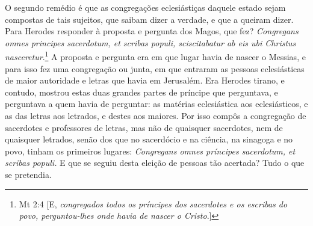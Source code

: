 O segundo remédio é que as congregações eclesiástiças daquele estado
sejam compostas de tais sujeitos, que saibam dizer a verdade, e que a
queiram dizer. Para Herodes responder à proposta e pergunta dos Magos,
que fez? \emph{Congregans omnes principes sacerdotum, et scribas populi,
sciscitabatur ab eis ubi Christus nasceretur}.\footnote{Mt 2:4 [E, \emph{congregados todos os príncipes dos sacerdotes e os escribas do povo, perguntou-lhes
onde havia de nascer o Cristo}.]} A proposta e
pergunta era em que lugar havia de nascer o Messias, e para isso fez uma
congregação ou junta, em que entraram as pessoas eclesiásticas de maior
autoridade e letras que havia em Jerusalém. Era Herodes tirano, e
contudo, mostrou estas duas grandes partes de príncipe que perguntava, e
perguntava a quem havia de perguntar: as matérias eclesiástica aos
eclesiásticos, e as das letras aos letrados, e destes aos maiores. Por
isso compôs a congregação de sacerdotes e professores de letras, mas não
de quaisquer sacerdotes, nem de quaisquer letrados, senão dos que no
sacerdócio e na ciência, na sinagoga e no povo, tinham os primeiros
lugares: \emph{Congregans omnes príncipes sacerdotum, et scribas
populi.} E que se seguiu desta eleição de pessoas tão acertada? Tudo o
que se pretendia.

